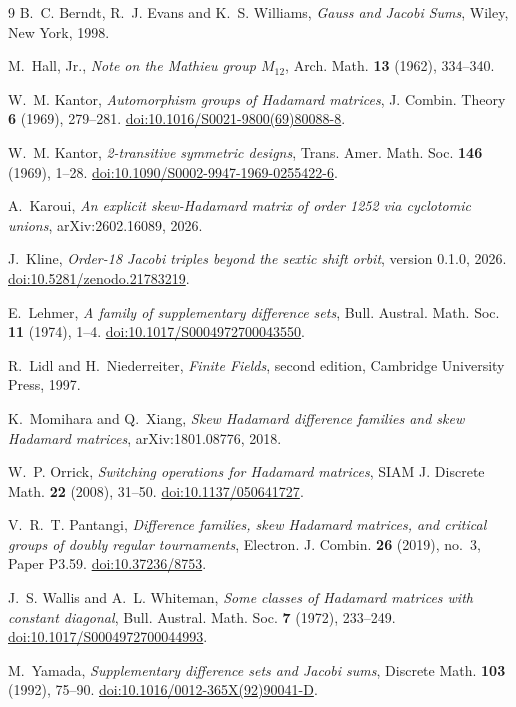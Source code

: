 \documentclass[11pt]{article}
\theoremstyle{plain}
\theoremstyle{definition}
\theoremstyle{remark}
\begin{document}
\begin{thebibliography}{9}
B.~C. Berndt, R.~J. Evans and K.~S. Williams,
\emph{Gauss and Jacobi Sums}, Wiley, New York, 1998.

M.~Hall, Jr.,
\emph{Note on the Mathieu group $M_{12}$},
Arch. Math. \textbf{13} (1962), 334--340.

W.~M. Kantor,
\emph{Automorphism groups of Hadamard matrices},
J. Combin. Theory \textbf{6} (1969), 279--281.
\href{https://doi.org/10.1016/S0021-9800(69)80088-8}{doi:10.1016/S0021-9800(69)80088-8}.

W.~M. Kantor,
\emph{2-transitive symmetric designs},
Trans. Amer. Math. Soc. \textbf{146} (1969), 1--28.
\href{https://doi.org/10.1090/S0002-9947-1969-0255422-6}{doi:10.1090/S0002-9947-1969-0255422-6}.

A.~Karoui,
\emph{An explicit skew-Hadamard matrix of order 1252 via cyclotomic unions},
arXiv:2602.16089, 2026.

J.~Kline,
\emph{Order-18 Jacobi triples beyond the sextic shift orbit}, version 0.1.0,
2026.
\href{https://doi.org/10.5281/zenodo.21783219}{doi:10.5281/zenodo.21783219}.

E.~Lehmer,
\emph{A family of supplementary difference sets},
Bull. Austral. Math. Soc. \textbf{11} (1974), 1--4.
\href{https://doi.org/10.1017/S0004972700043550}{doi:10.1017/S0004972700043550}.

R.~Lidl and H.~Niederreiter,
\emph{Finite Fields}, second edition,
Cambridge University Press, 1997.

K.~Momihara and Q.~Xiang,
\emph{Skew Hadamard difference families and skew Hadamard matrices},
arXiv:1801.08776, 2018.

W.~P. Orrick,
\emph{Switching operations for Hadamard matrices},
SIAM J. Discrete Math. \textbf{22} (2008), 31--50.
\href{https://doi.org/10.1137/050641727}{doi:10.1137/050641727}.

V.~R.~T. Pantangi,
\emph{Difference families, skew Hadamard matrices, and critical groups of
doubly regular tournaments}, Electron. J. Combin. \textbf{26} (2019), no.~3,
Paper P3.59.
\href{https://doi.org/10.37236/8753}{doi:10.37236/8753}.

J.~S. Wallis and A.~L. Whiteman,
\emph{Some classes of Hadamard matrices with constant diagonal},
Bull. Austral. Math. Soc. \textbf{7} (1972), 233--249.
\href{https://doi.org/10.1017/S0004972700044993}{doi:10.1017/S0004972700044993}.

M.~Yamada,
\emph{Supplementary difference sets and Jacobi sums},
Discrete Math. \textbf{103} (1992), 75--90.
\href{https://doi.org/10.1016/0012-365X(92)90041-D}{doi:10.1016/0012-365X(92)90041-D}.
\end{thebibliography}
\end{document}
